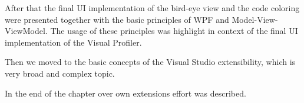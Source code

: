 After that the final UI implementation of the bird-eye view and the code coloring were presented together with the basic principles of WPF and Model-View-ViewModel. The usage of these principles was highlight in context of the final UI implementation of the Visual Profiler.

Then we moved to the basic concepts of the Visual Studio extensibility, which is very broad and complex topic.

In the end of the chapter over own extensions effort was described.











